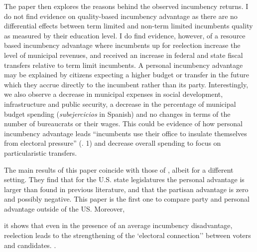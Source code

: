 \documentclass[12pt]{amsart}
\numberwithin{equation}{section}
\theoremstyle{definition}
\theoremstyle{definition}
\theoremstyle{definition}
\begin{document}
The paper then explores the reasons behind the observed incumbency returns. I do not find evidence on quality-based incumbency advantage as there are no differential effects between term limited and non-term limited incumbents quality as measured by their education level. I do find evidence, however, of a resource based incumbency advantage where incumbents up for reelection increase the level of municipal revenues, and received an increase in federal and state fiscal transfers relative to term limit incumbents. A personal incumbency advantage may be explained by citizens expecting a higher budget or transfer in the future which they accrue directly to the incumbent rather than its party. Interestingly, we also observe a decrease in municipal expenses in social development, infrastructure and public security, a decrease in the percentage of municipal budget spending (\emph{subejercicios} in Spanish) and no changes in terms of the number of bureaucrats or their wages. This could be evidence of how personal incumbency advantage leads ``incumbents use their office to insulate themselves from electoral pressure'' (\citet{eggers_2017}. 1) and decrease overall spending to focus on particularistic transfers.

The main results of this paper coincide with those of \citep{fowler_hall_2014}, albeit for a different setting. They find that for the U.S. state legislatures the personal advantage is larger than found in previous literature, and that the partisan advantage is zero and possibly negative. This paper is the first one to compare party and personal advantage outside of the US. Moreover, 


it shows that even in the presence of an average incumbency disadvantage, reelection leads to the strengthening of the `electoral connection'' between voters and candidates. \citep{mayhew_1974}. 

 
\end{document}
